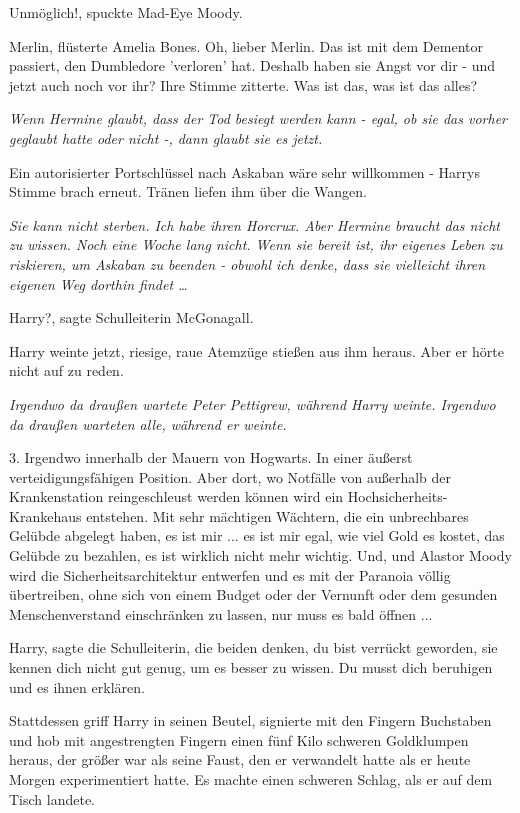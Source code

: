 \glqq{}Unmöglich!\grqq{}, spuckte Mad-Eye Moody.

\glqq{}Merlin\grqq{}, flüsterte Amelia Bones. \glqq{}Oh, lieber Merlin. Das ist
mit dem Dementor passiert, den Dumbledore 'verloren' hat. Deshalb haben sie
Angst vor dir - und jetzt auch noch vor ihr?\grqq{} Ihre Stimme zitterte. \glqq{}Was
ist das, was ist das alles?\grqq{}

\emph{Wenn Hermine glaubt, dass der Tod besiegt werden kann - egal, ob sie das
vorher geglaubt hatte oder nicht -, dann glaubt sie es jetzt.}

\glqq{}Ein autorisierter Portschlüssel nach Askaban wäre sehr willkommen -\grqq{}
Harrys Stimme brach erneut. Tränen liefen ihm über die Wangen.

\emph{Sie kann nicht sterben. Ich habe ihren Horcrux. Aber Hermine braucht das
nicht zu wissen. Noch eine Woche lang nicht. Wenn sie bereit ist, ihr eigenes
Leben zu riskieren, um Askaban zu beenden - obwohl ich denke, dass sie
vielleicht ihren eigenen Weg dorthin findet …}

Harry?\grqq{}, sagte Schulleiterin McGonagall.

Harry weinte jetzt, riesige, raue Atemzüge stießen aus ihm heraus. Aber er hörte
nicht auf zu reden.

\emph{Irgendwo da draußen wartete Peter Pettigrew, während Harry weinte.
Irgendwo da draußen warteten alle, während er weinte.}

\glqq{}3. Irgendwo innerhalb der Mauern von Hogwarts. In einer äußerst
verteidigungsfähigen Position. Aber dort, wo Notfälle von außerhalb der
Krankenstation reingeschleust werden können wird ein Hochsicherheits-Krankehaus
entstehen. Mit sehr mächtigen Wächtern, die ein unbrechbares Gelübde abgelegt
haben, es ist mir ... es ist mir egal, wie viel Gold es kostet, das Gelübde zu
bezahlen, es ist wirklich nicht mehr wichtig. Und, und Alastor Moody wird die
Sicherheitsarchitektur entwerfen und es mit der Paranoia völlig übertreiben,
ohne sich von einem Budget oder der Vernunft oder dem gesunden Menschenverstand
einschränken zu lassen, nur muss es bald öffnen ...\grqq{}

\glqq{}Harry\grqq{}, sagte die Schulleiterin, \glqq{}die beiden denken, du bist
verrückt geworden, sie kennen dich nicht gut genug, um es besser zu wissen. Du
musst dich beruhigen und es ihnen erklären.\grqq{}

Stattdessen griff Harry in seinen Beutel, signierte mit den Fingern Buchstaben
und hob mit angestrengten Fingern einen fünf Kilo schweren Goldklumpen heraus,
der größer war als seine Faust, den er verwandelt hatte als er heute Morgen
experimentiert hatte. Es machte einen schweren Schlag, als er auf dem Tisch
landete.

